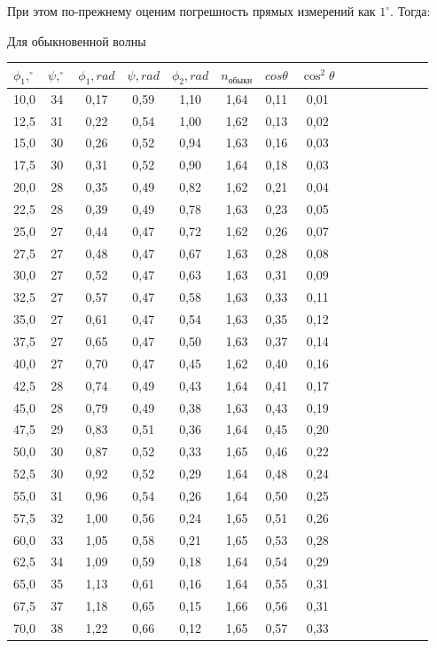\documentclass[14pt]{article}
\begin{document}
При этом по-прежнему оценим погрешность прямых измерений как $1^\circ$. Тогда:

\vspace{0.5cm}
Для обыкновенной волны
\begin{center}
\begin{tabular}{|c|c|c|c|c|c|c|c|c|c|c|c|c|c|c|}
\hline
$\phi_1, ^\circ$	&	$\psi, ^\circ$	&	$\phi_1, rad$	&	$\psi, rad$	&	$\phi_2, rad$	&	$n_\text{обыкн}$	&	$cos\theta$	&	$\cos^2\theta$	\\
\hline
10,0&34&0,17&0,59&1,10&1,64&0,11&0,01\\
\hline
12,5&31&0,22&0,54&1,00&1,62&0,13&0,02\\
\hline
15,0&30&0,26&0,52&0,94&1,63&0,16&0,03\\
\hline
17,5&30&0,31&0,52&0,90&1,64&0,18&0,03\\
\hline
20,0&28&0,35&0,49&0,82&1,62&0,21&0,04\\
\hline
22,5&28&0,39&0,49&0,78&1,63&0,23&0,05\\
\hline
25,0&27&0,44&0,47&0,72&1,62&0,26&0,07\\
\hline
27,5&27&0,48&0,47&0,67&1,63&0,28&0,08\\
\hline
30,0&27&0,52&0,47&0,63&1,63&0,31&0,09\\
\hline
32,5&27&0,57&0,47&0,58&1,63&0,33&0,11\\
\hline
35,0&27&0,61&0,47&0,54&1,63&0,35&0,12\\
\hline
37,5&27&0,65&0,47&0,50&1,63&0,37&0,14\\
\hline
40,0&27&0,70&0,47&0,45&1,62&0,40&0,16\\
\hline
42,5&28&0,74&0,49&0,43&1,64&0,41&0,17\\
\hline
45,0&28&0,79&0,49&0,38&1,63&0,43&0,19\\
\hline
47,5&29&0,83&0,51&0,36&1,64&0,45&0,20\\
\hline
50,0&30&0,87&0,52&0,33&1,65&0,46&0,22\\
\hline
52,5&30&0,92&0,52&0,29&1,64&0,48&0,24\\
\hline
55,0&31&0,96&0,54&0,26&1,64&0,50&0,25\\
\hline
57,5&32&1,00&0,56&0,24&1,65&0,51&0,26\\
\hline
60,0&33&1,05&0,58&0,21&1,65&0,53&0,28\\
\hline
62,5&34&1,09&0,59&0,18&1,64&0,54&0,29\\
\hline
65,0&35&1,13&0,61&0,16&1,64&0,55&0,31\\
\hline
67,5&37&1,18&0,65&0,15&1,66&0,56&0,31\\
\hline
70,0&38&1,22&0,66&0,12&1,65&0,57&0,33\\
\hline
\end{tabular}
\end{center}
\end{document}
